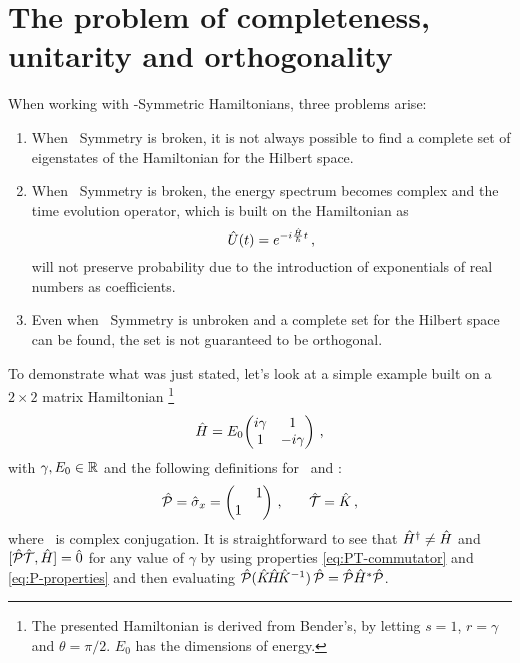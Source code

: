     \section{The problem of completeness, unitarity and orthogonality}\label{s:problem}
        When working with \PT-Symmetric Hamiltonians, three problems arise:
        \begin{enumerate}[label = \mybullet]
            \item When \PT\ Symmetry is broken, it is not always possible to find a complete set of eigenstates of the Hamiltonian for the Hilbert space.
            \item When \PT\ Symmetry is broken, the energy spectrum becomes complex and the time evolution operator, which is built on the Hamiltonian as 
            \begin{equation}
                \label{eq:time-evolution}
                \hU\pqty{t} = \myexp{-i\frac{\hH}{\hbar}t}
                \mycomma
            \end{equation}
            will not preserve probability due to the introduction of exponentials of real numbers as coefficients.
            \item Even when \PT\ Symmetry is unbroken and a complete set for the Hilbert space can be found, the set is not guaranteed to be orthogonal.
        \end{enumerate}
        To demonstrate what was just stated, let's look at a simple example built on a $2\times2$ matrix Hamiltonian \cite{Bender2005,Bender2007}\footnote{The presented Hamiltonian is derived from Bender's, by letting $s = 1$, $r = \gamma$ and $\theta = \pi/2$. $E_0$ has the dimensions of energy.}
        \begin{equation}
            \label{eq:ex:reduced-2x2-hamiltonian}
            \hH = E_0\! \pmqty{\dmat[1]{i\gamma, -i\gamma}}
            \mycomma
        \end{equation}
        with $\gamma,E_0\in\mathbb{R}$ and the following definitions for \hP\ and \hT :
        \begin{equation}
            \label{eq:ex:reduced-2x2-P-T}
            \hP = \hat{\sigma}_x = \pmqty{\admat{1,1}}
            \mycomma\qquad
            \hT = \hK
            \mycomma
        \end{equation}
        where \hK\ is complex conjugation. It is straightforward to see that $\hat{H}^\dag \neq \hat{H}$ and $\comm*{\hPT}{\hH}\! = \hzero$ for any value of $\gamma$ by using properties \eqref{eq:PT-commutator} and \eqref{eq:P-properties} and then evaluating $\hP\pqty*{\hK\!\hH\!\hK^{-1}}\hP = \hP\hH^*\hP$.
        
